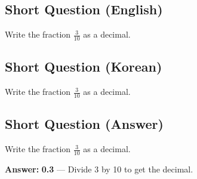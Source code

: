 \cleardoublepage
\subsection*{Short Question (English)}
Write the fraction $\frac{3}{10}$ as a decimal.


\newpage
\subsection*{Short Question (Korean)}
Write the fraction $\frac{3}{10}$ as a decimal.


\newpage
\subsection*{Short Question (Answer)}
Write the fraction $\frac{3}{10}$ as a decimal.

\textbf{Answer:} \textbf{0.3} — Divide 3 by 10 to get the decimal.
